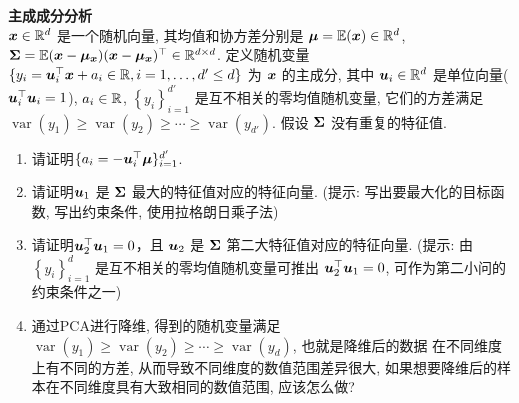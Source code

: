 \documentclass[answers]{exam}  %
\begin{document}
\begin{questions}
\question [20] \textbf{主成成分分析} \\
    ${\boldsymbol{x}} \in \mathbb{R}^{d}$ 是一个随机向量, 其均值和协方差分别是 $\boldsymbol{\mu}=\mathbb{E}({\boldsymbol{x}}) \in \mathbb{R}^{d}$, $\boldsymbol{\Sigma}=\mathbb{E}({\boldsymbol{x}}-\boldsymbol{\mu}_{\boldsymbol{x}})({\boldsymbol{x}}-\boldsymbol{\mu}_{\boldsymbol{x}})^{\top} \in \mathbb{R}^{d \times  d}$. 定义随机变量 $\{y_{i}=\boldsymbol{u}_{i}^{\top} {\boldsymbol{x}}+a_{i} \in \mathbb{R}, i=1, \ldots, {d'} \leq d\}$ 为 ${\boldsymbol{x}}$ 的主成分, 其中 $\boldsymbol{u}_{i} \in \mathbb{R}^{d}$ 是单位向量($\boldsymbol{u}_i^\top \boldsymbol{u}_i = 1$), $a_{i} \in \mathbb{R}$, $\left\{y_{i}\right\}_{i=1}^{{d'}}$ 是互不相关的零均值随机变量, 它们的方差满足 $\operatorname{var}\left(y_{1}\right) \geq \operatorname{var}\left(y_{2}\right) \geq \cdots \geq \operatorname{var}\left(y_{{d'}}\right)$. 假设 $\boldsymbol{\Sigma}$ 没有重复的特征值.
\begin{enumerate}
	\item  请证明$\{a_{i}=-\boldsymbol{u}_{i}^{\top} \boldsymbol{\mu}\}_{i=1}^{d'}$.
	\item 请证明$\boldsymbol{u}_{1}$ 是 $\boldsymbol{\Sigma}$ 最大的特征值对应的特征向量. (提示: 写出要最大化的目标函数, 写出约束条件, 使用拉格朗日乘子法)
	\item 请证明$\boldsymbol{u}_{2}^{\top} \boldsymbol{u}_{1}=0$，且 $\boldsymbol{u}_{2}$ 是 $\boldsymbol{\Sigma}$ 第二大特征值对应的特征向量. (提示: 由 $\left\{y_{i}\right\}_{i=1}^{d}$ 是互不相关的零均值随机变量可推出 $\boldsymbol{u}_{2}^{\top} \boldsymbol{u}_{1}=0$, 可作为第二小问的约束条件之一)
	\item 通过PCA进行降维, 得到的随机变量满足$\operatorname{var}\left(y_{1}\right) \geq \operatorname{var}\left(y_{2}\right) \geq \cdots \geq \operatorname{var}\left(y_{d}\right)$, 也就是降维后的数据 在不同维度上有不同的方差, 从而导致不同维度的数值范围差异很大, 如果想要降维后的样本在不同维度具有大致相同的数值范围, 应该怎么做?
\end{enumerate}
	\begin{solution}
	\end{solution}
\end{questions}
\end{document}
